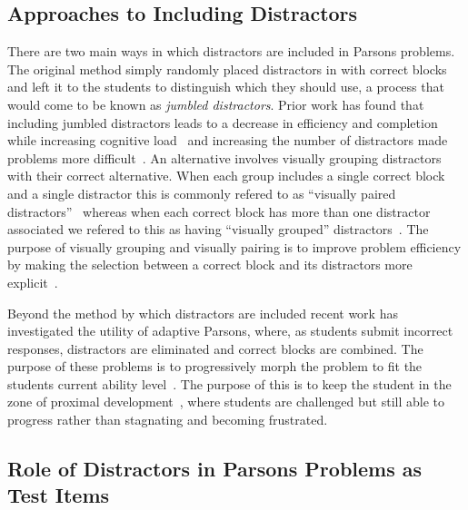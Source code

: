 \documentclass[authorversion,nonacm]{acmart}
\begin{document}
\subsection{Approaches to Including Distractors}

There are two main ways in which distractors are included in Parsons problems.
The original method simply randomly placed distractors in with correct blocks
and left it to the students to distinguish which they should use, a process 
that would come to be known as \textit{jumbled distractors}.
Prior work has found that including jumbled distractors leads to a decrease in
efficiency and completion while increasing cognitive
load~\cite{garner2007exploration, harms2016distractors} and increasing the
number of distractors made problems more difficult~\cite{ericson2015analysis}.
An alternative involves visually grouping distractors with their correct alternative.
When each group includes a single correct block and a single distractor this is commonly
refered to as ``visually paired distractors''~\cite{denny2008evaluating}
whereas when each correct block has more than one distractor associated we
refered to this as having ``visually grouped''
distractors~\cite{smith2023comparing}.  The purpose of visually grouping and
visually pairing is to improve problem efficiency by making the selection
between a correct block and its distractors more
explicit~\cite{denny2008evaluating}.

Beyond the method by which distractors are included 
recent work has investigated the utility of adaptive Parsons, where, 
as students submit incorrect responses, distractors are eliminated and correct
blocks are combined. The purpose of these problems is to progressively morph
the problem to fit the students current ability
level~\cite{ericson2016dynamically, ericson2019investigating}. The purpose of
this is to keep the student in the zone of proximal
development~\cite{vygotsky1978mind}, where students are challenged but still
able to progress rather than stagnating and becoming frustrated. 

\subsection{Role of Distractors in Parsons Problems as Test Items}
\end{document}
